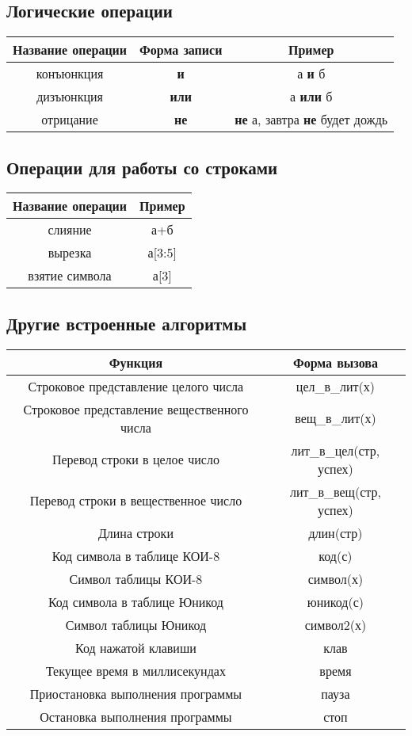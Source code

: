 \documentclass[12pt,a4paper]{article}
\begin{document}
\subsection{Логические операции}
\begin{center}
\begin{tabular}{||c|c||c||}
\hline
\hline
\textbf{Название операции} &
\textbf{Форма записи} &
\textbf{Пример} \\
\hline
конъюнкция & \textbf{и} & а \textbf{и} б\\
дизъюнкция & \textbf{или} & а \textbf{или} б\\
отрицание & \textbf{не} & \textbf{не} а, завтра \textbf{не} будет дождь\\
\hline
\hline
\end{tabular}
\end{center}

\subsection{Операции для работы со строками}
\begin{center}
\begin{tabular}{||c|c||}
\hline
\hline
\textbf{Название операции} &
\textbf{Пример} \\
\hline
слияние & а+б\\
вырезка & а[3:5]\\
взятие символа & а[3]\\
\hline
\hline
\end{tabular}
\end{center}


\subsection{Другие встроенные алгоритмы}
\begin{center}
\begin{tabular}{||c|c||}
\hline
\hline
\textbf{Функция} &
\textbf{Форма вызова}\\
\hline
\hline
Строковое представление целого числа &
цел\_в\_лит(х)\\
Строковое представление вещественного числа &
вещ\_в\_лит(х)\\
Перевод строки в целое число &
лит\_в\_цел(стр, успех)\\
Перевод строки в вещественное число &
лит\_в\_вещ(стр, успех)\\
\hline
Длина строки &
длин(стр)\\
Код символа в таблице КОИ-8 &
код(с)\\
Символ таблицы КОИ-8 &
символ(х)\\
Код символа в таблице Юникод &
юникод(с)\\
Символ таблицы Юникод &
символ2(х) \\
\hline
Код нажатой клавиши &
клав\\
Текущее время в миллисекундах &
время\\
Приостановка выполнения программы &
пауза\\
Остановка выполнения программы &
стоп\\
\hline
\hline
\end{tabular}
\end{center}
\printindex
\end{document}
